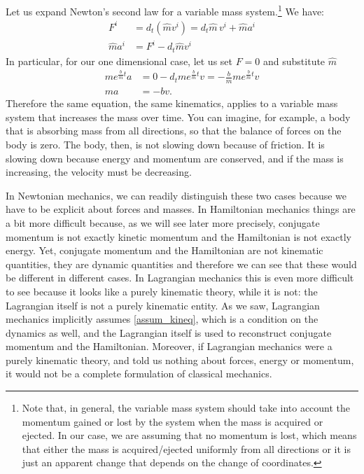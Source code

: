 Let us expand Newton's second law for a variable mass system.\footnote{Note that, in general, the variable mass system should take into account the momentum gained or lost by the system when the mass is acquired or ejected. In our case, we are assuming that no momentum is lost, which means that either the mass is acquired/ejected uniformly from all directions or it is just an apparent change that depends on the change of coordinates.} We have:
\begin{equation}
	\begin{aligned}
		F^i &= d_t (\hat{m}v^i) = d_t \hat{m} \, v^i + \hat{m} a^i \\
		\hat{m} a^i &= F^i - d_t \hat{m} v^i
	\end{aligned}
\end{equation}
In particular, for our one dimensional case, let us set $F=0$ and substitute $\hat{m}$
\begin{equation}
	\begin{aligned}
		m e^{\frac{b}{m}t} a &= 0 - d_t m e^{\frac{b}{m}t} v = -\frac{b}{m} m e^{\frac{b}{m}t} v \\
		ma &= -bv.
	\end{aligned}
\end{equation}
Therefore the same equation, the same kinematics, applies to a variable mass system that increases the mass over time. You can imagine, for example, a body that is absorbing mass from all directions, so that the balance of forces on the body is zero. The body, then, is not slowing down because of friction. It is slowing down because energy and momentum are conserved, and if the mass is increasing, the velocity must be decreasing.

In Newtonian mechanics, we can readily distinguish these two cases because we have to be explicit about forces and masses. In Hamiltonian mechanics things are a bit more difficult because, as we will see later more precisely, conjugate momentum is not exactly kinetic momentum and the Hamiltonian is not exactly energy. Yet, conjugate momentum and the Hamiltonian are not kinematic quantities, they are dynamic quantities and therefore we can see that these would be different in different cases. In Lagrangian mechanics this is even more difficult to see because it looks like a purely kinematic theory, while it is not: the Lagrangian itself is not a purely kinematic entity. As we saw, Lagrangian mechanics implicitly assumes \ref{assum_kineq}, which is a condition on the dynamics as well, and the Lagrangian itself is used to reconstruct conjugate momentum and the Hamiltonian. Moreover, if Lagrangian mechanics were a purely kinematic theory, and told us nothing about forces, energy or momentum, it would not be a complete formulation of classical mechanics.

